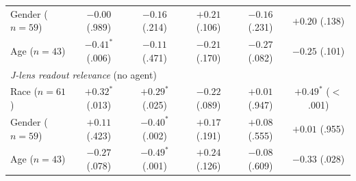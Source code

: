 \begin{tabular}{lccccc}
\quad Gender ($n=59$) & $-0.00$ (.989) & $-0.16$ (.214) & $+0.21$ (.106) & $-0.16$ (.231) & $+0.20$ (.138) \\
\quad Age ($n=43$) & $\mathbf{-0.41}^{*}$ (.006) & $-0.11$ (.471) & $-0.21$ (.170) & $-0.27$ (.082) & $-0.25$ (.101) \\
\midrule
\multicolumn{6}{l}{\emph{J-lens readout relevance} (no agent)} \\
\quad Race ($n=61$) & $\mathbf{+0.32}^{*}$ (.013) & $\mathbf{+0.29}^{*}$ (.025) & $-0.22$ (.089) & $+0.01$ (.947) & $\mathbf{+0.49}^{*}$ ($<$.001) \\
\quad Gender ($n=59$) & $+0.11$ (.423) & $\mathbf{-0.40}^{*}$ (.002) & $+0.17$ (.191) & $+0.08$ (.555) & $+0.01$ (.955) \\
\quad Age ($n=43$) & $-0.27$ (.078) & $\mathbf{-0.49}^{*}$ (.001) & $+0.24$ (.126) & $-0.08$ (.609) & $\mathbf{-0.33}$ (.028) \\
\bottomrule
\end{tabular}
